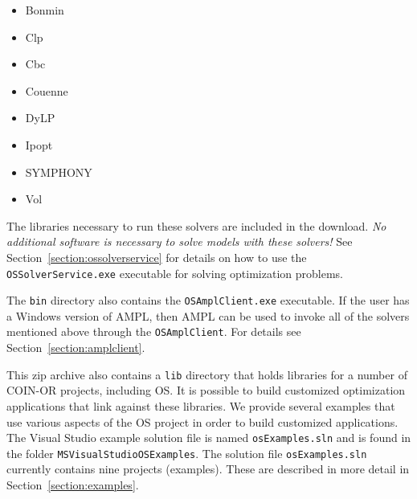 \documentclass[11pt]{article}
\renewcommand{\_}{{\char"5F}}
\renewcommand{\{}{{\char"7B}}
\renewcommand{\}}{{\char"7D}}
\renewcommand{\^}{{\char"0D}}
\renewcommand{\'}{{\char"0D}}
\begin{document}
\begin{itemize}

\item Bonmin

\item Clp

\item Cbc

\item Couenne

\item DyLP

\item Ipopt

\item SYMPHONY

\item Vol

\end{itemize}
The libraries necessary to run these solvers are included in the download.  {\it No additional software is necessary
to solve models with these solvers!}   See Section~\ref{section:ossolverservice} for details on how to use the
{\tt OSSolverService.exe} executable for solving optimization problems.


The {\tt bin} directory also contains the {\tt OSAmplClient.exe} executable. If the user has a Windows version of AMPL,
then AMPL can be used to invoke all of the solvers mentioned above through the {\tt OSAmplClient}.  For details
see Section~\ref{section:amplclient}.



This zip archive also contains a  {\tt lib} directory that holds  libraries
for a number of COIN-OR projects, including OS. It is possible to build
customized optimization applications that link against these libraries.
We provide several examples that use various aspects of the OS project
in order to build customized applications. The Visual Studio example solution
file is named {\tt osExamples.sln} and is found in the folder
{\tt MSVisualStudioOSExamples}. The solution file {\tt osExamples.sln}
currently contains nine projects (examples). These are described in more
detail in Section~\ref{section:examples}.
\end{document}
